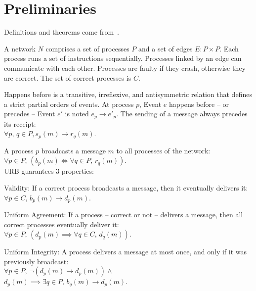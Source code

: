 
\section{Preliminaries}
\label{sec:preliminaries}

Definitions and theorems come from~\cite{hadzilacos1994modular}.

\begin{definition}[Network]
  A network $N$ comprises a set of processes $P$ and a set of edges
  $E: P \times P$. Each process runs a set of instructions
  sequentially. Processes linked by an edge can communicate with each
  other. Processes are faulty if they crash, otherwise they are correct. The set
  of correct processes is $C$.
\end{definition}



\begin{definition}
  Happens before is a transitive, irreflexive, and antisymmetric relation that
  defines a strict partial orders of events. At process $p$, Event $e$ happens
  before -- or precedes -- Event $e'$ is noted $e_p \rightarrow e'_p$. The
  sending of a message always precedes its receipt: \\
  $\forall p,\,q \in P, s_p(m) \rightarrow r_q(m)$.
\end{definition}

\begin{definition}
  A process $p$ broadcasts a message $m$ to all processes of the network: \\
  $\forall p \in P,\, (b_p(m) \Leftrightarrow \forall q \in P,\, r_q(m))$. \\ URB guarantees 3 properties: 

  \begin{asparadesc}
  \item [Validity:] If a correct process broadcasts a message, then it eventually
    delivers it: $\forall p \in C,\, b_p(m) \rightarrow d_p(m)$.
  \item [Uniform Agreement:] If a process -- correct or not -- delivers a message,
    then all correct processes eventually deliver it:\\
    $\forall p \in P,\, (d_p(m) \implies \forall q \in C,\, d_q(m))$.
  \item [Uniform Integrity:] A process delivers a message at most once, and
    only if it was previously broadcast:\\
    $\forall p \in P,\, \neg(d_p(m) \rightarrow d_p(m)) \wedge$\\$d_p(m)
    \implies \exists q \in P,\, b_q(m) \rightarrow d_p(m)$.
\end{asparadesc}

\end{definition}


